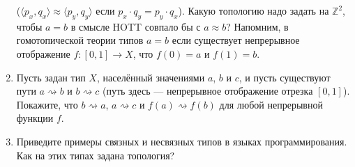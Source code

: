 \documentclass[10pt,a4paper,oneside]{article}
\begin{document}
\begin{enumerate}
($\langle p_x,q_x\rangle \approx \langle p_y,q_y\rangle$ если $p_x \cdot q_y = p_y \cdot q_x$). 
Какую топологию надо задать на $\mathbb{Z}^2$, чтобы $a=b$ в смысле HOTT совпало бы с $a \approx b$?
Напомним, в гомотопической теории типов $a=b$ если существует непрерывное отображение $f: [0,1]\rightarrow X$, что
$f(0)=a$ и $f(1)=b$.
\item Пусть задан тип $X$, населённый значениями $a$, $b$ и $c$, и пусть существуют
пути $a \rightsquigarrow b$ и $b \rightsquigarrow c$ (путь здесь --- непрерывное отображение
отрезка $[0,1]$). Покажите, что $b \rightsquigarrow a$, $a \rightsquigarrow c$ и 
$f(a) \rightsquigarrow f(b)$ для любой непрерывной функции $f$.
\item Приведите примеры связных и несвязных типов в языках программирования. Как на этих типах задана топология?
\end{enumerate}
\end{document}
